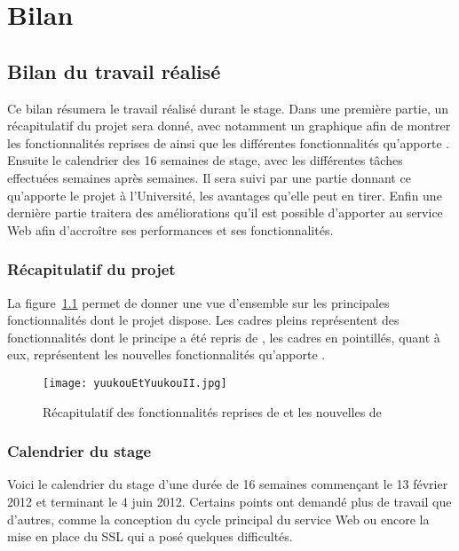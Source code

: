 \chapter{Bilan}

\section{Bilan du travail r\'ealis\'e}

Ce bilan r\'esumera le travail r\'ealis\'e durant le stage.
Dans une premi\`ere partie, un r\'ecapitulatif du projet sera donn\'e, avec notamment un graphique afin de montrer les fonctionnalit\'es reprises de {\Yuukou} ainsi que les diff\'erentes fonctionnalit\'es qu'apporte {\YuukouII}.
Ensuite le calendrier des 16 semaines de stage, avec les diff\'erentes t\^aches effectu\'ees semaines apr\`es semaines.
Il sera suivi par une partie donnant ce qu'apporte le projet \`a l'Universit\'e, les avantages qu'elle peut en tirer.
Enfin une derni\`ere partie traitera des am\'eliorations qu'il est possible d'apporter au service Web afin d'accro\^itre ses performances et ses fonctionnalit\'es.

\subsection{R\'ecapitulatif du projet}

La figure~\ref{figure:yuukouEtYuukouII} permet de donner une vue d'ensemble sur les principales fonctionnalit\'es dont le projet dispose.
Les cadres pleins repr\'esentent des fonctionnalit\'es dont le principe a \'et\'e repris de {\Yuukou}, les cadres en pointill\'es, quant \`a eux, repr\'esentent les nouvelles fonctionnalit\'es qu'apporte \YuukouII.

\clearpage

\begin{figure}[!ht]
	\centering
	\texttt{[image: yuukouEtYuukouII.jpg]}
	\caption{R\'ecapitulatif des fonctionnalit\'es reprises de {\Yuukou} et les nouvelles de \YuukouII}
	\label{figure:yuukouEtYuukouII}

\end{figure}

\subsection{Calendrier du stage}

Voici le calendrier du stage d'une dur\'ee de 16 semaines commen\c{c}ant le 13 f\'evrier 2012 et terminant le 4 juin 2012.
Certains points ont demand\'e plus de travail que d'autres, comme la conception du cycle principal du service Web ou encore la mise en place du SSL qui a pos\'e quelques difficult\'es.

